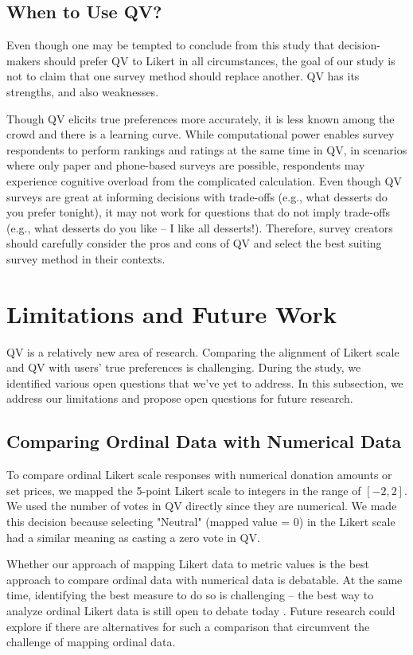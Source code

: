 \subsection{When to Use QV?}
Even though one may be tempted to conclude from this study that decision-makers should prefer QV to Likert in all circumstances, the goal of our study is not to claim that one survey method should replace another. QV has its strengths, and also weaknesses. 

Though QV elicits true preferences more accurately, it is less known among the crowd and there is a learning curve. While computational power enables survey respondents to perform rankings and ratings at the same time in QV, in scenarios where only paper and phone-based surveys are possible, respondents may experience cognitive overload from the complicated calculation. Even though QV surveys are great at informing decisions with trade-offs (e.g., what desserts do you prefer tonight), it may not work for questions that do not imply trade-offs (e.g., what desserts do you like -- I like all desserts!). Therefore, survey creators should carefully consider the pros and cons of QV and select the best suiting survey method in their contexts.

\section{Limitations and Future Work}
QV is a relatively new area of research. Comparing the alignment of Likert scale and QV with users' true preferences is challenging. During the study, we identified various open questions that we've yet to address. In this subsection, we address our limitations and propose open questions for future research. 

\subsection{Comparing Ordinal Data with Numerical Data}
To compare ordinal Likert scale responses with numerical donation amounts or set prices, we mapped the 5-point Likert scale to integers in the range of $[-2, 2]$. We used the number of votes in QV directly since they are numerical. We made this decision because selecting "Neutral" (mapped value = 0) in the Likert scale had a similar meaning as casting a zero vote in QV.

Whether our approach of mapping Likert data to metric values is the best approach to compare ordinal data with numerical data is debatable. At the same time, identifying the best measure to do so is challenging -- the best way to analyze ordinal Likert data is still open to debate today \cite{gob2007ordinal}. Future research could explore if there are alternatives for such a comparison that circumvent the challenge of mapping ordinal data. 

